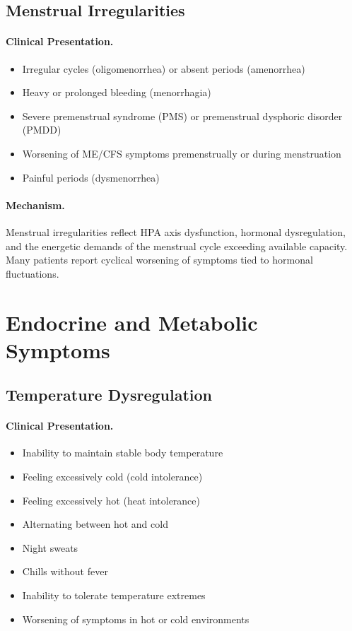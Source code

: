 \subsection{Menstrual Irregularities}
\label{subsec:menstrual}

\paragraph{Clinical Presentation.}
\begin{itemize}
    \item Irregular cycles (oligomenorrhea) or absent periods (amenorrhea)
    \item Heavy or prolonged bleeding (menorrhagia)
    \item Severe premenstrual syndrome (PMS) or premenstrual dysphoric disorder (PMDD)
    \item Worsening of ME/CFS symptoms premenstrually or during menstruation
    \item Painful periods (dysmenorrhea)
\end{itemize}

\paragraph{Mechanism.}
Menstrual irregularities reflect HPA axis dysfunction, hormonal dysregulation, and the energetic demands of the menstrual cycle exceeding available capacity. Many patients report cyclical worsening of symptoms tied to hormonal fluctuations.

\section{Endocrine and Metabolic Symptoms}
\label{sec:endocrine-metabolic}

\subsection{Temperature Dysregulation}
\label{subsec:temperature}

\paragraph{Clinical Presentation.}
\begin{itemize}
    \item Inability to maintain stable body temperature
    \item Feeling excessively cold (cold intolerance)
    \item Feeling excessively hot (heat intolerance)
    \item Alternating between hot and cold
    \item Night sweats
    \item Chills without fever
    \item Inability to tolerate temperature extremes
    \item Worsening of symptoms in hot or cold environments
\end{itemize}

